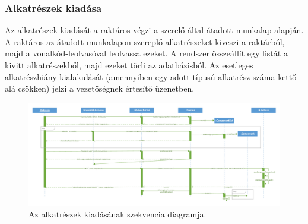 \documentclass[12pt]{article}\usepackage[left=20mm,right=20mm,top=20mm,bottom=20mm]{geometry}
\begin{document}
\thispagestyle{empty}
\begin{landscape}
\subsubsection{Alkatrészek kiadása}
Az alkatrészek kiadását a raktáros végzi a szerelő által átadott munkalap alapján. 
A raktáros az átadott munkalapon szereplő alkatrészeket kiveszi a raktárból, majd a vonalkód-leolvasóval leolvassa ezeket. 
A rendszer összeállít egy listát a kivitt alkatrészekből, majd ezeket törli az adatbázisból.
Az esetleges alkatrészhiány kialakulását (amennyiben egy adott típusú alkatrész száma kettő alá csökken) jelzi a vezetőségnek értesítő üzenetben. 

\begin{figure}[!h]
    \centering
        \includegraphics[width=1.4\textwidth]{kepek/kiadas_szekvencia.pdf}
        \caption{Az alkatrészek kiadásának szekvencia diagramja.}
\end{figure}
\end{landscape}
\end{document}
